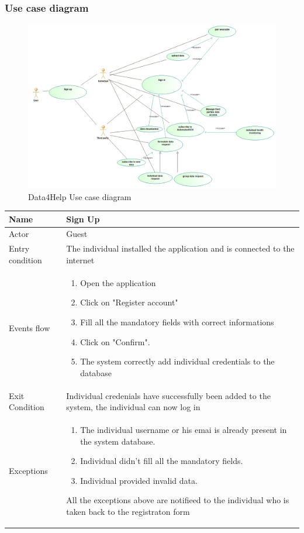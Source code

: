 \subsubsection{Use case diagram}
\begin{figure}
  \includegraphics[width=0.95\linewidth]{resources/UML/GeneralUseCase.png}
  \caption{Data4Help Use case diagram}
  \label{fig:Use case diagram}
\end{figure}


\begin{tabular}{|l|p{11cm}|}
    \hline
    Name & Sign Up
    \\ \hline
    Actor & Guest
    \\ \hline 
    Entry condition & The individual installed the application and is connected to the internet
    \\ \hline
    Events flow &
    \begin{enumerate}
    \item Open the application
    \item Click on "Register account"
    \item Fill all the mandatory fields with correct informations
    \item Click on "Confirm".
    \item The system correctly add individual credentials to the database
    \end{enumerate}
     \\ \hline
     Exit Condition & Individual credenials have successfully been added to the system,
     the individual can now log in     
     \\
    \hline
    Exceptions &
        \begin{enumerate}
    \item The individual username or his emai is already present in the system database.
    \item Individual didn't fill all the mandatory fields.
    \item Individual provided invalid data.
  
    \end{enumerate}
    All the exceptions above are notifieed to the individual who is taken back to the registraton form
      \\
    \hline
\end{tabular}



